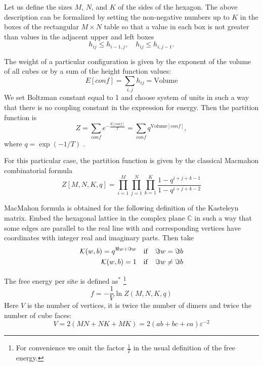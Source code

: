 \documentclass{article}
\begin{document}
Let us define the sizes $M$, $N$, and $K$ of the sides of the hexagon.
The above description can be formalized by
setting the non-negative numbers up to $K$ in the boxes of the rectangular $M\times N$ table so that a value in
each box is not greater than values in the adjacent upper and left boxes
\begin{equation}
  \label{eq:1}
  h_{ij}\leq h_{i-1,j},\quad h_{ij}\leq h_{i,j-1}.
\end{equation}

The weight of a particular configuration is given by the exponent of the volume of all cubes or by a
sum of the height function values:
\begin{equation*}
  \label{eq:10}
  E[conf]=\sum_{i,j} h_{ij}=\mathrm{Volume}
\end{equation*}
We set Boltzman constant equal to 1 and choose system of units in such a way that there is no
coupling constant in the expression for energy. Then the partition function is
\begin{equation*}
  \label{eq:14}
  Z=\sum_{conf} e^{-\frac{E[conf]}{T}}=\sum_{conf}q^{\mathrm{Volume}[conf]}, 
\end{equation*}
where $q=\exp\left(-1/T\right)$ .

For this particular case, the partition function is given by the classical Macmahon combinatorial
formula~\cite{vuletic2009generalization}
\begin{equation}
  \label{eq:12}
   Z[M,N,K,q]=\prod_{i=1}^{M}\prod_{j=1}^{N}\prod_{k=1}^{K}\frac{1-q^{i+j+k-1}}{1-q^{i+j+k-2}}
\end{equation}


MacMahon formula is obtained for the following definition of the Kasteleyn matrix. Embed the
hexagonal lattice in the complex plane $\mathbb{C}$ in such a way that some edges are parallel to
the real line with and corresponding vertices have coordinates with integer real and imaginary
parts. Then take
\begin{eqnarray}
  \label{eq:18}
  {\cal K}(w,b)=q^{\Re w+\Im w} \quad \mathrm{if}\quad \Im w=\Im b\\
  {\cal K}(w,b)=1 \quad \mathrm{if}\quad \Im w\neq\Im b
\end{eqnarray}


The   free energy per site is defined as$^{*}$
\footnote{For convenience we omit the factor $\frac{1}{T}$ in the usual definition of the free energy.}
\begin{equation*}
  \label{eq:17}
  f=-\frac{1}{V}\ln Z(M,N,K,q)
\end{equation*}
Here $V$ is the number of vertices, it is twice the number of dimers and twice the number of  cube faces:
\begin{equation}
  \label{eq:19}
  V=2(MN+NK+MK)=2(ab+bc+ca) \varepsilon^{-2}
\end{equation}
\end{document}
